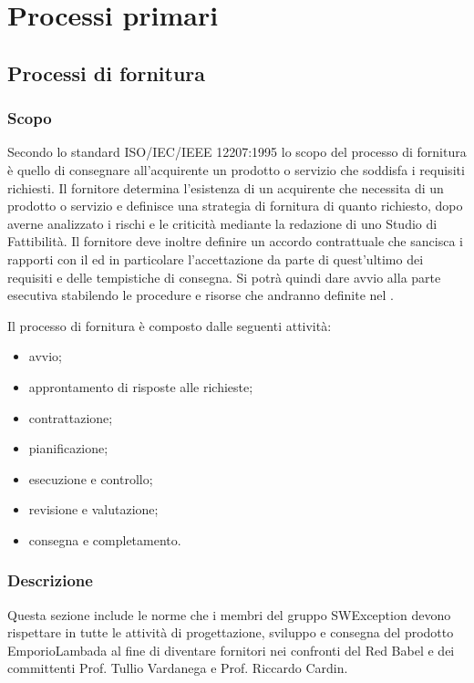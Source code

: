 \section{Processi primari}

\subsection{Processi di fornitura}
\label{_processiDiFornitura}
\subsubsection{Scopo}
Secondo lo standard ISO/IEC/IEEE 12207:1995 lo scopo del processo di fornitura è quello di consegnare all'acquirente un prodotto o servizio che soddisfa i requisiti richiesti.  Il fornitore determina l'esistenza di un acquirente che necessita di un prodotto o servizio e definisce una strategia di fornitura di quanto richiesto, dopo averne analizzato i rischi e le criticità mediante la redazione di uno Studio di Fattibilità.
Il fornitore deve inoltre definire un accordo contrattuale che sancisca i rapporti con il  ed in particolare l'accettazione da parte di quest'ultimo dei requisiti e delle tempistiche di consegna.  Si potrà quindi dare avvio alla parte esecutiva stabilendo le procedure e risorse che andranno definite nel .

Il processo di fornitura è composto dalle seguenti attività:
\begin{itemize}
  \item avvio;
  \item approntamento di risposte alle richieste;
  \item contrattazione;
  \item pianificazione;
  \item esecuzione e controllo;
  \item revisione e valutazione;
  \item consegna e completamento.
\end{itemize}

\subsubsection{Descrizione}
Questa sezione include le norme che i membri del gruppo SWException devono rispettare in tutte le attività di progettazione, sviluppo e consegna del prodotto EmporioLambada al fine di diventare fornitori nei confronti del  Red Babel e dei committenti Prof. Tullio Vardanega e Prof. Riccardo Cardin.
